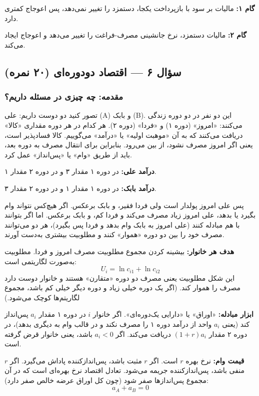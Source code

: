 \documentclass[12pt,a4paper]{article}
\begin{document}
\textbf{گام ۱:} مالیات بر سود با بازپرداخت یکجا، دستمزد را تغییر نمی‌دهد، پس اعوجاج کمتری دارد.

\textbf{گام ۲:} مالیات دستمزد، نرخ جانشینی مصرف-فراغت را تغییر می‌دهد و اعوجاج ایجاد می‌کند.

\subsection{سؤال ۶ — اقتصاد دودوره‌ای (۲۰ نمره)}

\subsubsection{مقدمه: چه چیزی در مسئله داریم؟}

تصور کنید دو دوست داریم: علی (A) و بابک (B). این دو نفر در دو دوره زندگی می‌کنند: «امروز» (دوره ۱) و «فردا» (دوره ۲). هر کدام در هر دوره مقداری «کالا» دریافت می‌کنند که به آن «موهبت اولیه» یا «درآمد» می‌گوییم. کالا فسادپذیر است، یعنی اگر امروز مصرف نشود، از بین می‌رود. بنابراین برای انتقال مصرف به دوره بعد، باید از طریق «وام» یا «پس‌انداز» عمل کرد.

\textbf{درآمد علی:} در دوره ۱ مقدار ۳ و در دوره ۲ مقدار ۱.

\textbf{درآمد بابک:} در دوره ۱ مقدار ۱ و در دوره ۲ مقدار ۳.

پس علی امروز پولدار است ولی فردا فقیر، و بابک برعکس. اگر هیچ‌کس نتواند وام بگیرد یا بدهد، علی امروز زیاد مصرف می‌کند و فردا کم، و بابک برعکس. اما اگر بتوانند با هم مبادله کنند (علی امروز به بابک وام بدهد و فردا پس بگیرد)، هر دو می‌توانند مصرف خود را بین دو دوره «هموار» کنند و مطلوبیت بیشتری به‌دست آورند.

\textbf{هدف هر خانوار:} بیشینه کردن مجموع مطلوبیت مصرف امروز و فردا. مطلوبیت به‌صورت لگاریتمی است:
\[
	U_i = \ln c_{i1} + \ln c_{i2}
\]
این شکل مطلوبیت یعنی مصرف دو دوره «متقارن» هستند و خانوار دوست دارد مصرف را هموار کند. (اگر یک دوره خیلی زیاد و دوره دیگر خیلی کم باشد، مجموع لگاریتم‌ها کوچک می‌شود.)

\textbf{ابزار مبادله:} «اوراق» یا «دارایی یک‌دوره‌ای». اگر خانوار $i$ در دوره ۱ مقدار $a_i$ پس‌انداز کند (یعنی $a_i$ واحد از درآمد دوره ۱ را مصرف نکند و در قالب وام به دیگری بدهد)، در دوره ۲ مقدار $(1+r) a_i$ دریافت می‌کند. اگر $a_i < 0$ باشد، یعنی خانوار قرض گرفته است.

\textbf{قیمت وام:} نرخ بهره $r$ است. اگر $r$ مثبت باشد، پس‌اندازکننده پاداش می‌گیرد. اگر $r$ منفی باشد، پس‌اندازکننده جریمه می‌شود. تعادل اقتصاد نرخ بهره‌ای است که در آن مجموع پس‌اندازها صفر شود (چون کل اوراق عرضه خالص صفر دارد):
\[
	a_A + a_B = 0
\]
\end{document}
